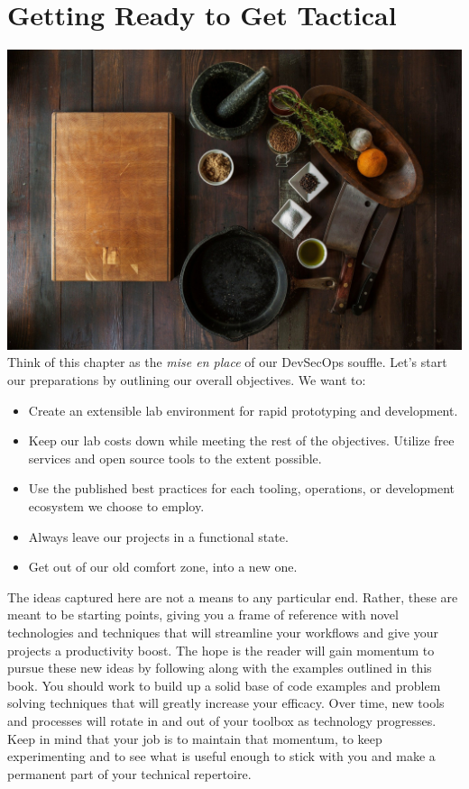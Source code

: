 \chapter{Getting Ready to Get Tactical}
\includegraphics[scale=0.20]{../images/ingredients-498199_1920.jpg}
\justify{}
Think of this chapter as the \emph{mise en place} of our DevSecOps souffle.
\pagebreak
\justify{}
Let's start our preparations by outlining our overall objectives. We want to:
\justify{}
\begin{itemize}
	\item
	      Create an extensible lab environment for rapid prototyping and
	      development.
	\item
	      Keep our lab costs down while meeting the rest of the objectives.
	      Utilize free services and open source tools to the extent possible.
	\item
	      Use the published best practices for each tooling, operations, or
	      development ecosystem we choose to employ.
	\item
	      Always leave our projects in a functional state.
	\item
	      Get out of our old comfort zone, into a new one.
\end{itemize}
\justify{}
The ideas captured here are not a means to any particular end. Rather,
these are meant to be starting points, giving you a frame of reference
with novel technologies and techniques that will streamline your
workflows and give your projects a productivity boost. The hope is the
reader will gain momentum to pursue these new ideas by following
along with the examples outlined in this book.
\justify{}
You should work to build up a solid base of code examples and problem solving
techniques that will greatly increase your efficacy. Over time, new tools and
processes will rotate in and out of your toolbox as technology progresses. Keep
in mind that your job is to maintain that momentum, to keep experimenting and
to see what is useful enough to stick with you and make a permanent part of your
technical repertoire.

